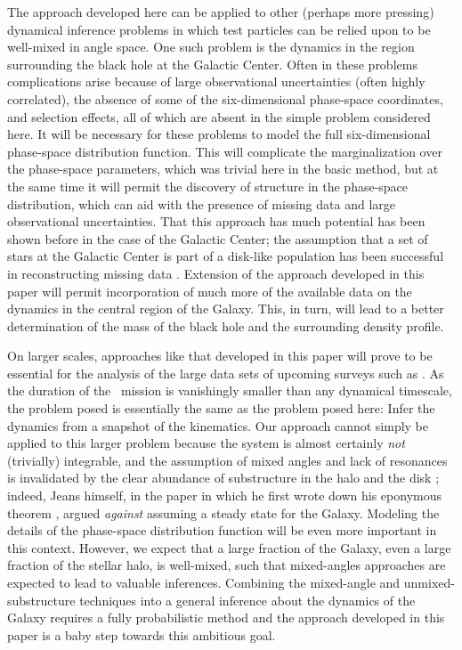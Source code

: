 The approach developed here can be applied to other (perhaps more
pressing) dynamical inference problems in which test particles can be
relied upon to be well-mixed in angle space. One such problem is the
dynamics in the region surrounding the black hole at the Galactic
Center. Often in these problems complications arise because of large
observational uncertainties (often highly correlated), the absence of
some of the six-dimensional phase-space coordinates, and selection
effects, all of which are absent in the simple problem considered
here.  It will be necessary for these problems to model the full
six-dimensional phase-space distribution function.  This will
complicate the marginalization over the phase-space parameters, which
was trivial here in the basic method, but at the same time it will
permit the discovery of structure in the phase-space distribution,
which can aid with the presence of missing data and large
observational uncertainties.  That this approach has much potential
has been shown before in the case of the Galactic Center; the
assumption that a set of stars at the Galactic Center is part of a
disk-like population has been successful in reconstructing missing
data \citep{Beloborodov06a}. Extension of the approach developed in
this paper will permit incorporation of much more of the available
data on the dynamics in the central region of the Galaxy.  This, in
turn, will lead to a better determination of the mass of the black
hole and the surrounding density profile.

On larger scales, approaches like that developed in this paper will
prove to be essential for the analysis of the large data sets of
upcoming surveys such as \Gaia. As the duration of the \Gaia\ mission
is vanishingly smaller than any dynamical timescale, the problem posed
is essentially the same as the problem posed here: Infer the dynamics
from a snapshot of the kinematics.  Our approach cannot simply be
applied to this larger problem because the system is almost certainly
\emph{not} (trivially) integrable, and the assumption of mixed angles
and lack of resonances is invalidated by the clear abundance of
substructure in the halo \citep[\eg,
][]{willman,belokurovfield,belokurov,koposov} and the disk
\citep{1998AJ....115.2384D,Bovy09a}; indeed, Jeans himself, in the paper in
which he first wrote down his eponymous theorem \citep{Jeans15a},
argued \emph{against} assuming a steady state for the Galaxy.
Modeling the details of the phase-space distribution function will be
even more important in this context.  However, we expect that a large
fraction of the Galaxy, even a large fraction of the stellar halo, is
well-mixed, such that mixed-angles approaches are expected to lead to
valuable inferences. Combining the mixed-angle and
unmixed-substructure techniques into a general inference about the
dynamics of the Galaxy requires a fully probabilistic method and the
approach developed in this paper is a baby step towards this ambitious
goal.


